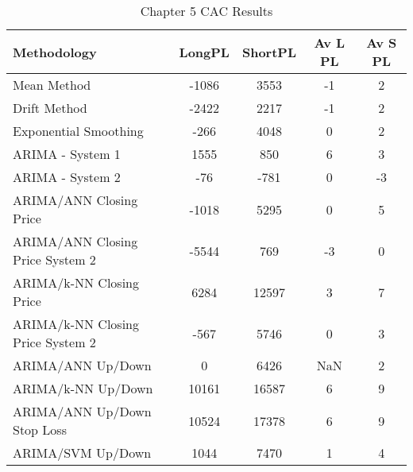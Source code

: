 \begin{table}[ht]
\centering
\caption[Chapter 5 CAC Results]{Chapter 5 CAC Results} 
\label{tab:chp6:cac2_summary}
\begin{tabular}{lcccc}
  \toprule Methodology & LongPL & ShortPL & Av L PL & Av S PL \\ 
  \midrule Mean Method & -1086 & 3553 & -1 & 2 \\ 
  Drift Method & -2422 & 2217 & -1 & 2 \\ 
  Exponential Smoothing & -266 & 4048 & 0 & 2 \\ 
  ARIMA - System 1 & 1555 & 850 & 6 & 3 \\ 
  ARIMA - System 2 & -76 & -781 & 0 & -3 \\ 
  ARIMA/ANN Closing Price & -1018 & 5295 & 0 & 5 \\ 
  ARIMA/ANN Closing Price System 2 & -5544 & 769 & -3 & 0 \\ 
  ARIMA/k-NN Closing Price & 6284 & 12597 & 3 & 7 \\ 
  ARIMA/k-NN Closing Price System 2 & -567 & 5746 & 0 & 3 \\ 
  ARIMA/ANN Up/Down & 0 & 6426 & NaN & 2 \\ 
  ARIMA/k-NN Up/Down & 10161 & 16587 & 6 & 9 \\ 
  ARIMA/ANN Up/Down Stop Loss & 10524 & 17378 & 6 & 9 \\ 
  ARIMA/SVM Up/Down & 1044 & 7470 & 1 & 4 \\ 
   \bottomrule \end{tabular}
\end{table}
